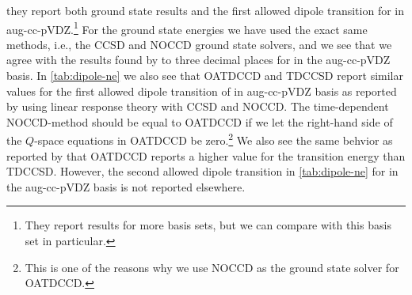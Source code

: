         \citeauthor{gauge-invariant-thomas-2} \cite{gauge-invariant-thomas-2}
        they report both ground state results and the first allowed dipole
        transition for  in aug-cc-pVDZ.\footnote{%
            They report results for more basis sets, but we can compare with
            this basis set in particular.
        }
        For the ground state energies we have used the exact same methods, i.e.,
        the CCSD and NOCCD ground state solvers, and we see that we agree with
        the results found by \citeauthor{gauge-invariant-thomas-2}
        \cite{gauge-invariant-thomas-2} to three decimal places for  in
        the aug-cc-pVDZ basis.
        In \autoref{tab:dipole-ne} we also see that OATDCCD and TDCCSD report
        similar values for the first allowed dipole transition of  in
        aug-cc-pVDZ basis as reported by \citeauthor{gauge-invariant-thomas-2}
        \cite{gauge-invariant-thomas-2} using linear response theory with CCSD
        and NOCCD.
        The time-dependent NOCCD-method should be equal to OATDCCD if we let the
        right-hand side of the $Q$-space equations in OATDCCD be
        zero.\footnote{%
            This is one of the reasons why we use NOCCD as the ground state
            solver for OATDCCD.
        }
        We also see the same behvior as reported by
        \citeauthor{gauge-invariant-thomas-2} \cite{gauge-invariant-thomas-2}
        that OATDCCD reports a higher value for the transition energy than
        TDCCSD.
        However, the second allowed dipole transition in \autoref{tab:dipole-ne}
        for  in the aug-cc-pVDZ basis is not reported elsewhere.
